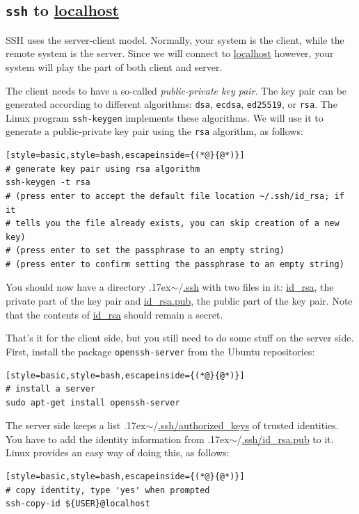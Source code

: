 \documentclass[12pt, a4paper, twoside, openany, titlepage]{book}
\newcommand{\mytilde}{\raise.17ex\hbox{$\scriptstyle\sim$}}
\begin{document}
\subsection{\texttt{ssh} to \url{localhost}}

SSH uses the server-client model. Normally, your system is the client, while the remote system is the server. Since we will connect to \url{localhost} however, your system will play the part of both client and server.

The client needs to have a so-called \textit{public-private key pair}. The key pair can be generated according to different algorithms:
\texttt{dsa},
\texttt{ecdsa},
\texttt{ed25519}, or
\texttt{rsa}.
The Linux program \texttt{ssh-keygen} implements these algorithms. We will use it to generate a public-private key pair using the \texttt{rsa} algorithm, as follows:

\begin{lstlisting}[style=basic,style=bash,escapeinside={(*@}{@*)}]
# generate key pair using rsa algorithm
ssh-keygen -t rsa
# (press enter to accept the default file location ~/.ssh/id_rsa; if it
# tells you the file already exists, you can skip creation of a new key)
# (press enter to set the passphrase to an empty string)
# (press enter to confirm setting the passphrase to an empty string)
\end{lstlisting}

You should now have a directory \mytilde/\url{.ssh} with two files in it: \url{id_rsa},  the private part of the key pair and \url{id_rsa.pub}, the public part of the key pair. Note that the contents of \url{id_rsa} should remain a secret.

That's it for the client side, but you still need to do some stuff on the server side. First, install the package \texttt{openssh-server} from the Ubuntu repositories:
\begin{lstlisting}[style=basic,style=bash,escapeinside={(*@}{@*)}]
# install a server
sudo apt-get install openssh-server
\end{lstlisting} %

The server side keeps a list \mytilde/\url{.ssh/authorized_keys} of trusted identities. You have to add the identity information from \mytilde/\url{.ssh/id_rsa.pub} to it. Linux provides an easy way of doing this, as follows:
\begin{lstlisting}[style=basic,style=bash,escapeinside={(*@}{@*)}]
# copy identity, type 'yes' when prompted
ssh-copy-id ${USER}@localhost
\end{lstlisting} %
\end{document}
